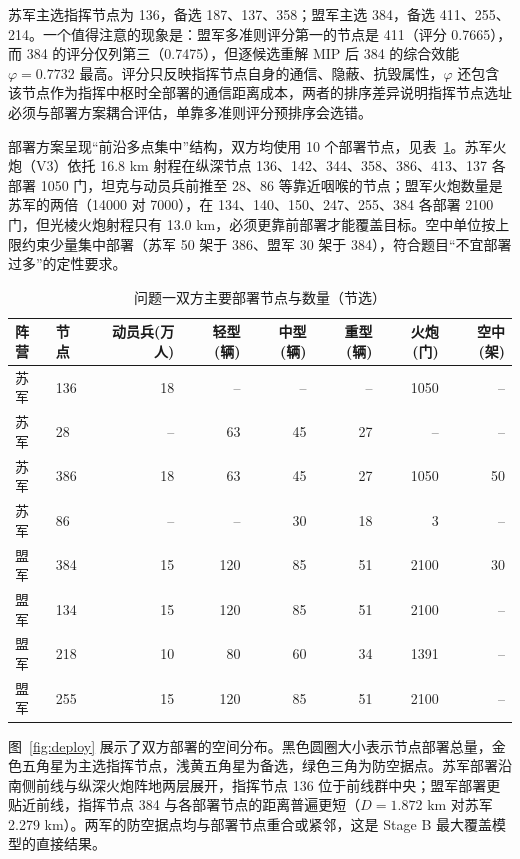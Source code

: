 \documentclass[12pt,a4paper]{ctexart}
\begin{document}
苏军主选指挥节点为 136，备选 187、137、358；盟军主选 384，备选 411、255、214。一个值得注意的现象是：盟军多准则评分第一的节点是 411（评分 0.7665），而 384 的评分仅列第三（0.7475），但逐候选重解 MIP 后 384 的综合效能 $\varphi=0.7732$ 最高。评分只反映指挥节点自身的通信、隐蔽、抗毁属性，$\varphi$ 还包含该节点作为指挥中枢时全部署的通信距离成本，两者的排序差异说明指挥节点选址必须与部署方案耦合评估，单靠多准则评分预排序会选错。

部署方案呈现“前沿多点集中”结构，双方均使用 10 个部署节点，见表~\ref{tab:q1deploy}。苏军火炮（V3）依托 16.8 km 射程在纵深节点 136、142、344、358、386、413、137 各部署 1050 门，坦克与动员兵前推至 28、86 等靠近咽喉的节点；盟军火炮数量是苏军的两倍（14000 对 7000），在 134、140、150、247、255、384 各部署 2100 门，但光棱火炮射程只有 13.0 km，必须更靠前部署才能覆盖目标。空中单位按上限约束少量集中部署（苏军 50 架于 386、盟军 30 架于 384），符合题目“不宜部署过多”的定性要求。

\begin{table}[H]
\centering
\caption{问题一双方主要部署节点与数量（节选）}
\label{tab:q1deploy}
{\setlength{\tabcolsep}{5pt}
\begin{tabular}{llrrrrrr}
\toprule
阵营 & 节点 & 动员兵(万人) & 轻型(辆) & 中型(辆) & 重型(辆) & 火炮(门) & 空中(架) \\
\midrule
苏军 & 136 & 18 & -- & -- & -- & 1050 & -- \\
苏军 & 28 & -- & 63 & 45 & 27 & -- & -- \\
苏军 & 386 & 18 & 63 & 45 & 27 & 1050 & 50 \\
苏军 & 86 & -- & -- & 30 & 18 & 3 & -- \\
盟军 & 384 & 15 & 120 & 85 & 51 & 2100 & 30 \\
盟军 & 134 & 15 & 120 & 85 & 51 & 2100 & -- \\
盟军 & 218 & 10 & 80 & 60 & 34 & 1391 & -- \\
盟军 & 255 & 15 & 120 & 85 & 51 & 2100 & -- \\
\bottomrule
\end{tabular}}
\end{table}

图~\ref{fig:deploy} 展示了双方部署的空间分布。黑色圆圈大小表示节点部署总量，金色五角星为主选指挥节点，浅黄五角星为备选，绿色三角为防空据点。苏军部署沿南侧前线与纵深火炮阵地两层展开，指挥节点 136 位于前线群中央；盟军部署更贴近前线，指挥节点 384 与各部署节点的距离普遍更短（$D=1.872$ km 对苏军 2.279 km）。两军的防空据点均与部署节点重合或紧邻，这是 Stage B 最大覆盖模型的直接结果。
\end{document}
